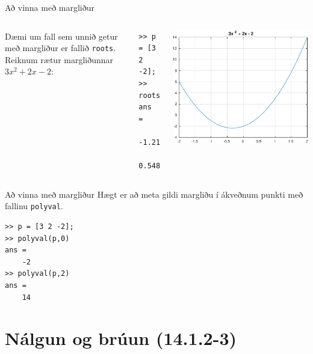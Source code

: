 \documentclass{beamer}
\begin{document}
\begin{frame}[fragile]{Að vinna með margliður}
\vspace{\baselineskip}
\begin{columns}
Dæmi um fall sem unnið getur með margliður er fallið \texttt{roots}. Reiknum rætur margliðunnar $3x^2 + 2x - 2$:
\begin{verbatim}
>> p = [3 2 -2];
>> roots(p)
ans =
   -1.2153
    0.5486
\end{verbatim}
\includegraphics[width=\linewidth]{Pics/poly-example}
\end{columns}
\end{frame}

\begin{frame}[fragile]{Að vinna með margliður}
Hægt er að meta gildi margliðu í ákveðnum punkti með fallinu \texttt{polyval}.
\begin{verbatim}
>> p = [3 2 -2];
>> polyval(p,0)
ans =
    -2
>> polyval(p,2)
ans =
    14
\end{verbatim}
\end{frame}

\section{Nálgun og brúun (14.1.2-3)}
\end{document}
